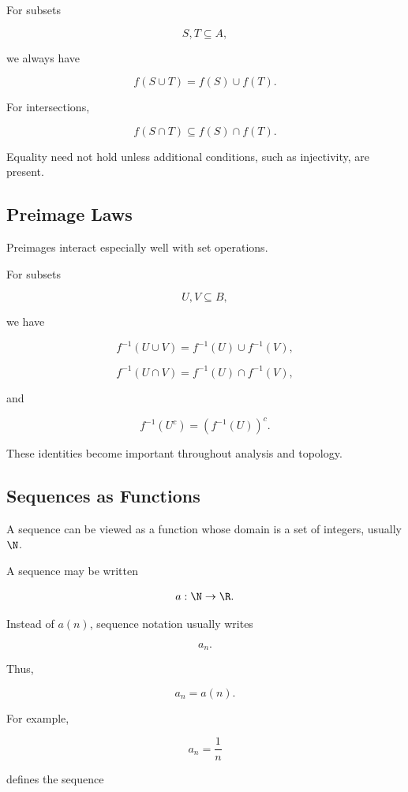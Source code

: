 For subsets

\[ S,T\subseteq A, \]

we always have

\[ f(S\cup T)=f(S)\cup f(T). \]

For intersections,

\[ f(S\cap T)\subseteq f(S)\cap f(T). \]

Equality need not hold unless additional conditions, such as injectivity, are
present.

\subsection{Preimage Laws}
\label{subsec:preimage-laws}

Preimages interact especially well with set operations.

For subsets

\[ U,V\subseteq B, \]

we have

\[ f^{-1}(U\cup V)=f^{-1}(U)\cup f^{-1}(V), \]

\[ f^{-1}(U\cap V)=f^{-1}(U)\cap f^{-1}(V), \]

and

\[ f^{-1}(U^c)=\left(f^{-1}(U)\right)^c. \]

These identities become important throughout analysis and topology.

\subsection{Sequences as Functions}
\label{subsec:sequences-as-functions}

A sequence can be viewed as a function whose domain is a set of integers,
usually \(\N\).

A sequence may be written

\[ a:\N\to\R. \]

Instead of \(a(n)\), sequence notation usually writes

\[ a_n. \]

Thus,

\[ a_n=a(n). \]

For example,

\[ a_n=\frac1n \]

defines the sequence

